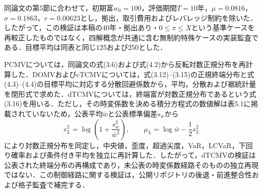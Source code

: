 \documentclass[10pt,a4paper]{article}
\theoremstyle{plain}
\theoremstyle{definition}
\begin{document}
同論文の第5節に合わせて，初期富$w_0=100$，評価期間$T=10$年，$\mu=0.0816$，$\sigma=0.1863$，$r=0.00623$とし，拠出，取引費用およびレバレッジ制約を除いた．したがって，この検証は本稿の40年・拠出あり・$0\leq\pi\leq X$という基準ケースを再較正したものではなく，四解概念が共通に含む無制約特殊ケースの実装監査である．目標平均は同表と同じ125および250とした．

PCMVについては，同論文の式(3.6)および式(4.2)から反転対数正規分布を再計算した．DOMVおよびcTCMVについては，式(3.12)--(3.15)の正規終端分布と式(4.3)--(4.4)の目標平均に対応する分散回避係数から，平均，分散および裾統計量を閉形式で求めた．dTCMVについては，終端富が対数正規分布であるという式(3.16)を用いる．ただし，その時変係数を決める積分方程式の数値解は表5.1に掲載されていないため，公表平均$\bar w$と公表標準偏差$s_w$から
\begin{equation}
 s_L^2=\log\!\left(1+\frac{s_w^2}{\bar w^2}\right),
 \qquad
 \mu_L=\log \bar w-\frac12s_L^2
 \label{eq:dtcmv-external-lognormal-identification}
\end{equation}
により対数正規分布を同定し，中央値，歪度，超過尖度，VaR，LCVaR，下回り確率および条件付き平均を独立に再計算した．したがって，dTCMVの検証は公表された終端分布の再構成であり，未公表の時変係数経路そのものの独立再現ではない．この制御経路に関する検証は，公開リポジトリの後退・前進整合性および格子監査で補完する．
\end{document}
